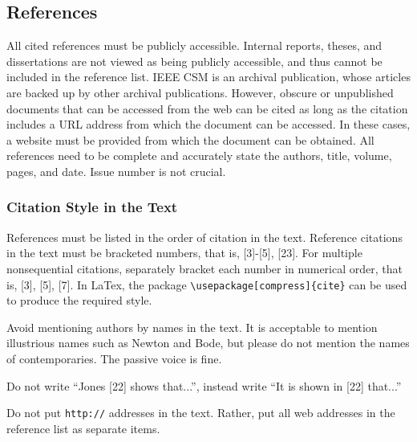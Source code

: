 \subsection{References}
All cited references must be publicly accessible.  Internal reports, theses, and dissertations are not viewed as being publicly accessible, and thus cannot be included in the reference list.  IEEE CSM is an archival publication, whose articles are backed up by other archival publications. However, obscure or unpublished documents that can be accessed from the web can be cited as long as the citation includes a URL address from which the document can be accessed.  In these cases, a website must be provided from which the document can be obtained.
All references need to be complete and accurately state the authors, title, volume, pages, and date.  Issue number is not crucial.

\subsubsection{Citation Style in the Text}
References must be listed in the order of citation in the text. Reference citations in the text must be bracketed numbers, that is, [3]-[5], [23]. For multiple nonsequential citations, separately bracket each number in numerical order, that is, [3], [5], [7].  In LaTex, the package 
\verb!\usepackage[compress]{cite}!  can be used to produce the required style.

Avoid mentioning authors by names in the text.  It is acceptable to mention illustrious names such as Newton and Bode, but please do not mention the names of contemporaries.  The passive voice is fine.  
\bi
\item Do not write  ``Jones [22] shows that...'',  instead write  ``It is shown in [22] that...''
\item Do not put {\tt http://} addresses in the text.  Rather, put all web addresses in the reference list as separate items.
 \ei
 

